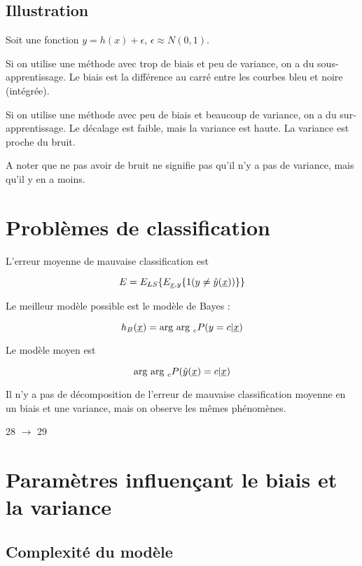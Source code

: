 		\subsection{Illustration}
		
		Soit une fonction $y = h(x) + \epsilon$, $\epsilon \approx N(0, 1)$.
		
		
		Si on utilise une méthode avec trop de biais et peu de variance, on a du sous-apprentissage. Le biais est la différence au carré entre les courbes bleu et noire (intégrée).
		
		
		Si on utilise une méthode avec peu de biais et beaucoup de variance, on a du sur-apprentissage. Le décalage est faible, mais la variance est haute. La variance est proche du bruit.
		
		
		A noter que ne pas avoir de bruit ne signifie pas qu'il n'y a pas de variance, mais qu'il y en a moins.
		
		
		
	\section{Problèmes de classification}
	
	L'erreur moyenne de mauvaise classification est
	
	$$E = E_{LS}\{E_{\underline{x}, y}\{1 (y \neq \hat{y}(\underline{x}))\}\}$$
	
	Le meilleur modèle possible est le modèle de Bayes :
	
	$$h_B(\underline{x}) = \text{arg } \text{arg }_c P(y = c \vert \underline{x})$$
	
	Le modèle moyen est
	
	$$\text{arg } \text{arg }_c P(\hat{y}(\underline{x}) = c \vert \underline{x})$$
	
	Il n'y a pas de décomposition de l'erreur de mauvaise classification moyenne en un biais et une variance, mais on observe les mêmes phénomènes.
	
	28 $\rightarrow$ 29
	
	\section{Paramètres influençant le biais et la variance}
	
		\subsection{Complexité du modèle}
		
